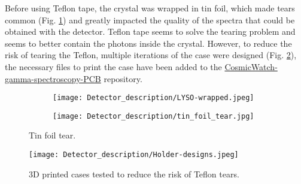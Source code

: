 Before using Teflon tape, the crystal was wrapped in tin foil, which made tears common (Fig. \ref{fig:tin_foil_tear}) and greatly impacted the quality of the spectra that could be obtained with the detector. Teflon tape seems to solve the tearing problem and seems to better contain the photons inside the crystal. However, to reduce the risk of tearing the Teflon, multiple iterations of the case were designed (Fig. \ref{fig:3d_previous_desings}), the necessary files to print the case have been added to the \href{https://github.com/anvargasl/CosmicWatch-gamma-spectroscopy-PCB}{CosmicWatch-gamma-spectroscopy-PCB} repository.
\begin{figure}
    \centering
    \begin{subfigure}[t]{0.35\textwidth}
      \texttt{[image: Detector\_description/LYSO-wrapped.jpeg]}
    \end{subfigure}
    \begin{subfigure}[t]{0.35\textwidth}
      \texttt{[image: Detector\_description/tin\_foil\_tear.jpg]}
    \end{subfigure}
    \caption{\label{fig:tin_foil_tear}Tin foil tear.}
\end{figure}

\begin{figure}
    \centering
    \texttt{[image: Detector\_description/Holder-designs.jpeg]}
    \caption{3D printed cases tested to reduce the risk of Teflon tears.}
    \label{fig:3d_previous_desings}
\end{figure}
